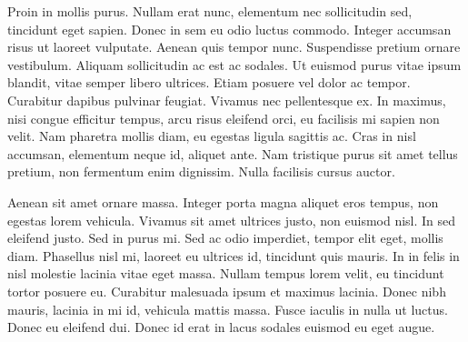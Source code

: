\documentclass{lowell-prop}
\begin{document}
%
%
% 



\observingRequest 

Proin in mollis purus. Nullam erat nunc, elementum nec sollicitudin
sed, tincidunt eget sapien. Donec in sem eu odio luctus
commodo. Integer accumsan risus ut laoreet vulputate. Aenean quis
tempor nunc. Suspendisse pretium ornare vestibulum. Aliquam
sollicitudin ac est ac sodales. Ut euismod purus vitae ipsum blandit,
vitae semper libero ultrices. Etiam posuere vel dolor ac
tempor. Curabitur dapibus pulvinar feugiat. Vivamus nec pellentesque
ex. In maximus, nisi congue efficitur tempus, arcu risus eleifend
orci, eu facilisis mi sapien non velit. Nam pharetra mollis diam, eu
egestas ligula sagittis ac. Cras in nisl accumsan, elementum neque id,
aliquet ante. Nam tristique purus sit amet tellus pretium, non
fermentum enim dignissim. Nulla facilisis cursus auctor.

Aenean sit amet ornare massa. Integer porta magna aliquet eros tempus,
non egestas lorem vehicula. Vivamus sit amet ultrices justo, non
euismod nisl. In sed eleifend justo. Sed in purus mi. Sed ac odio
imperdiet, tempor elit eget, mollis diam. Phasellus nisl mi, laoreet
eu ultrices id, tincidunt quis mauris. In in felis in nisl molestie
lacinia vitae eget massa. Nullam tempus lorem velit, eu tincidunt
tortor posuere eu. Curabitur malesuada ipsum et maximus lacinia. Donec
nibh mauris, lacinia in mi id, vehicula mattis massa. Fusce iaculis in
nulla ut luctus. Donec eu eleifend dui. Donec id erat in lacus sodales
euismod eu eget augue.
\end{document}
